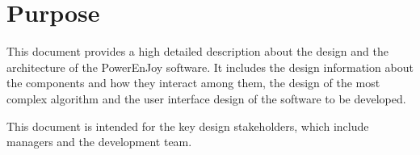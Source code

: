 \section{Purpose}
This document provides a high detailed description about the design and the architecture of the PowerEnJoy software.
It includes the design information about the components and how they interact among them, the design of the most complex algorithm and the user interface design of the software to be developed.

This document is intended for the key design stakeholders, which include managers and the development team.
